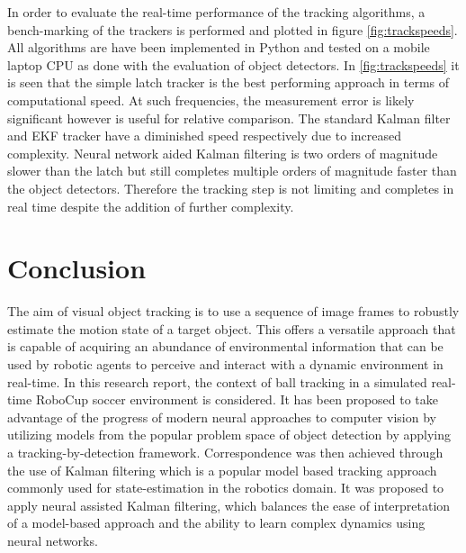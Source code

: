 \documentclass[a4paper,twoside,12pt]{report}
\begin{document}
In order to evaluate the real-time performance of the tracking algorithms, a bench-marking of the trackers is performed and plotted in figure \ref{fig:trackspeeds}. All algorithms are have been implemented in Python and tested on a mobile laptop CPU as done with the evaluation of object detectors. In \ref{fig:trackspeeds} it is seen that the simple latch tracker is the best performing approach in terms of computational speed. At such frequencies, the measurement error is likely significant however is useful for relative comparison. The standard Kalman filter and EKF tracker have a diminished speed respectively due to increased complexity. Neural network aided Kalman filtering is two orders of magnitude slower than the latch but still completes multiple orders of magnitude faster than the object detectors. Therefore the tracking step is not limiting and completes in real time despite the addition of further complexity. 

\chapter{Conclusion}

The aim of visual object tracking is to use a sequence of image frames to robustly estimate the motion state of a target object. This offers a versatile approach that is capable of acquiring an abundance of environmental information that can be used by robotic agents to perceive and interact with a dynamic environment in real-time. In this research report, the context of ball tracking in a simulated real-time RoboCup soccer environment is considered. It has been proposed to take advantage of the progress of modern neural approaches to computer vision by utilizing models from the popular problem space of object detection by applying a tracking-by-detection framework. Correspondence was then achieved through the use of Kalman filtering which is a popular model based tracking approach commonly used for state-estimation in the robotics domain. It was proposed to apply neural assisted Kalman filtering, which balances the ease of interpretation of a model-based approach and the ability to learn complex dynamics using neural networks. 
\end{document}
